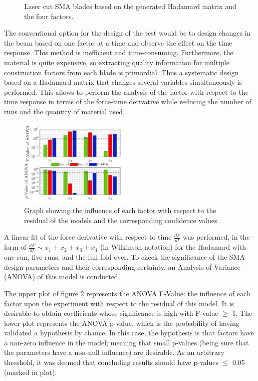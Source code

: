 \begin{figure}
	\vspace{-10pt}
	\centering
	\def\svgwidth{0.5\columnwidth}
	
	\caption{Laser cut SMA blades based on the generated Hadamard matrix and the four factors.}
	\vspace{-10pt}
	\label{fig:BladeSample}
\end{figure}
The conventional option for the design of the test would be to design changes in the beam based on one factor at a time and observe the effect on the time response. This method is inefficient and time-consuming. Furthermore, the material is quite expensive, so extracting quality information for multiple construction factors from each blade is primordial. Thus a systematic design based on a Hadamard matrix that changes several variables simultaneously is performed. This allows to perform the analysis of the factor with respect to the time response in terms of the force-time derivative while reducing the number of runs and the quantity of material used.
\begin{figure}
	\vspace{-10pt}
    \centering
    \includegraphics[width=0.50\textwidth]{Figures/fig_bar.pdf}
    \caption{Graph showing the influence of each factor with respect to the residual of the models and the corresponding confidence values.}
		\vspace{-10pt}
    \label{fig:bar1}
\end{figure}

A linear fit of the force derivative with respect to time $\frac{dF}{dt}$ was performed, in the form of $\frac{dF}{dt} \sim x_1+x_2+x_3+x_4 $ (in Wilkinson notation) for the Hadamard with one run, five runs, and the full fold-over. To check the significance of the SMA design parameters and their corresponding certainty, an Analysis of Variance (ANOVA) of this model is conducted.

The upper plot of figure \ref{fig:bar1} represents the ANOVA F-Value: the influence of each factor upon the experiment with respect to the residual of this model. It is desirable to obtain coefficients whose significance is high with F-value $\geq$ 1. The lower plot represents the ANOVA p-value, which is the probability of having validated a hypothesis by chance. In this case, the hypothesis is that factors have a non-zero influence in the model; meaning that small p-values (being sure that the parameters have a non-null influence) are desirable. As an arbitrary threshold, it was deemed that concluding results should have p-values $\leq$ 0.05 (marked in plot).

